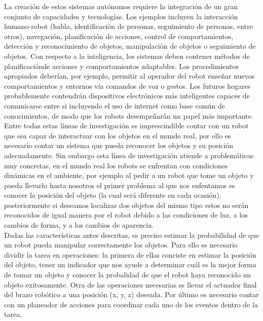 		La creación de estos sistemas autónomos requiere la integración de un gran conjunto de capacidades y tecnologías. Los ejemplos incluyen la interacción humano-robot (habla, identificación de personas, seguimiento de personas, entre otros), navegación, planificación de acciones, control de comportamientos, detección y reconocimiento de objetos, manipulación de objetos o seguimiento de objetos. Con respecto a la inteligencia, los sistemas deben contener métodos de planificaciónde acciones y comportamientos adaptables. Los procedimientos apropiados deberían, por ejemplo, permitir al operador del robot enseñar nuevos comportamientos y entornos vía comandos de voz o gestos. Los futuros hogares probablemente contendrán dispositivos electrónicos más inteligentes capaces de comunicarse entre si incluyendo el uso de internet como base común de conocimientos, de modo que los robots desempeñarán un papel más importante.\\

		Entre todas estas líneas de investigación es imprescindible contar con un robot que sea capaz de interactuar con los objetos en el mundo real, por ello es necesario contar un sistema que pueda reconocer los objetos y su posición adecuadamente. Sin embargo esta línea de investigación atiende a problemáticas muy concretas, en el mundo real  los robots se enfrentan con condiciones dinámicas en el ambiente, por ejemplo al pedir a un robot que tome un objeto y pueda llevarlo hasta nosotros el primer problema al que nos enfentamos es conocer la posición del objeto (la cual será diferente en cada ocasión), posteriormente si deseamos localizar dos objetos del mismo tipo estos no serán reconocidos de igual manera por el robot debido a las condiciones de luz, a los cambios de forma, y a los cambios de aparencia.\\


		Dadas las características antes descritas, es preciso estimar la probabilidad de que un robot pueda manipular correctamente los objetos. Para ello es necesario dividir la tarea en operaciones: la primera de ellas conciste en estimar la posición del objeto, tener un indicador que nos ayude a determinar cuál es la mejor forma de tomar un objeto y conocer la probalidad de que el robot haya reconocido un objeto exitosamente. Otra de las operaciones necesarias es llevar el actuador final del brazo robótico a una posición (x, y, z) deseada. Por último es necesario contar con un planeador de acciones para coordinar cada uno de los eventos dentro de la tarea.\\


